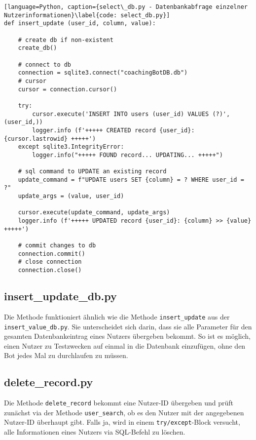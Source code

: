                 \begin{lstlisting}[language=Python, caption={select\_db.py - Datenbankabfrage einzelner Nutzerinformationen}\label{code: select_db.py}]
def insert_update (user_id, column, value):

    # create db if non-existent
    create_db()

    # connect to db
    connection = sqlite3.connect("coachingBotDB.db")
    # cursor
    cursor = connection.cursor()

    try:
        cursor.execute('INSERT INTO users (user_id) VALUES (?)', (user_id,))
        logger.info (f'+++++ CREATED record {user_id}: {cursor.lastrowid} +++++')
    except sqlite3.IntegrityError:
        logger.info("+++++ FOUND record... UPDATING... +++++")

    # sql command to UPDATE an existing record
    update_command = f"UPDATE users SET {column} = ? WHERE user_id = ?"
    update_args = (value, user_id)

    cursor.execute(update_command, update_args)
    logger.info (f'+++++ UPDATED record {user_id}: {column} >> {value} +++++')

    # commit changes to db
    connection.commit()
    # close connection
    connection.close()

                \end{lstlisting}
        
        \subsection{insert\_update\_db.py} \label{Implementierung: insert_update_db.py}
                Die Methode funktioniert ähnlich wie die Methode \verb|insert_update| aus der \\\verb|insert_value_db.py|. Sie unterscheidet sich darin, dass sie alle Parameter für den gesamten Datenbankeintrag eines Nutzers übergeben bekommt. So ist es möglich, einen Nutzer zu Testzwecken auf einmal in die Datenbank einzufügen, ohne den Bot jedes Mal zu durchlaufen zu müssen.
        
        \subsection{delete\_record.py} \label{Implementierung: delete_record.py}
                Die Methode \verb|delete_record| bekommt eine Nutzer-ID übergeben und prüft zunächst via der Methode \verb|user_search|, ob es den Nutzer mit der angegebenen Nutzer-ID überhaupt gibt. Falls ja, wird in einem \verb|try/except|-Block versucht, alle Informationen eines Nutzers via SQL-Befehl zu löschen. 


